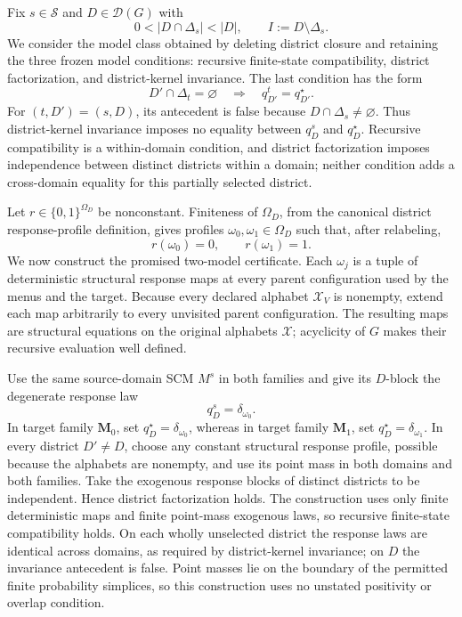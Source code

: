 Fix \(s\in\mathcal S\) and \(D\in\mathcal D(G)\) with
\[
0<\lvert D\cap\Delta_s\rvert<\lvert D\rvert,
\qquad I:=D\setminus\Delta_s.
\]
We consider the model class obtained by deleting district closure and retaining the three frozen model conditions: recursive finite-state compatibility, district factorization, and district-kernel invariance.  The last condition has the form
\[
D'\cap\Delta_t=\varnothing
\quad\Longrightarrow\quad
q_{D'}^t=q_{D'}^\star.
\]
For \((t,D')=(s,D)\), its antecedent is false because \(D\cap\Delta_s\ne\varnothing\).  Thus district-kernel invariance imposes no equality between \(q_D^s\) and \(q_D^\star\).  Recursive compatibility is a within-domain condition, and district factorization imposes independence between distinct districts within a domain; neither condition adds a cross-domain equality for this partially selected district.

Let \(r\in\{0,1\}^{\Omega_D}\) be nonconstant.  Finiteness of \(\Omega_D\), from the canonical district response-profile definition, gives profiles \(\omega_0,\omega_1\in\Omega_D\) such that, after relabeling,
\[
r(\omega_0)=0,
\qquad
r(\omega_1)=1.
\]
We now construct the promised two-model certificate.  Each \(\omega_j\) is a tuple of deterministic structural response maps at every parent configuration used by the menus and the target.  Because every declared alphabet \(\mathcal X_V\) is nonempty, extend each map arbitrarily to every unvisited parent configuration.  The resulting maps are structural equations on the original alphabets \(\mathcal X\); acyclicity of \(G\) makes their recursive evaluation well defined.

Use the same source-domain SCM \(M^s\) in both families and give its \(D\)-block the degenerate response law
\[
q_D^s=\delta_{\omega_0}.
\]
In target family \(\mathbf M_0\), set \(q_D^\star=\delta_{\omega_0}\), whereas in target family \(\mathbf M_1\), set \(q_D^\star=\delta_{\omega_1}\).  In every district \(D'\ne D\), choose any constant structural response profile, possible because the alphabets are nonempty, and use its point mass in both domains and both families.  Take the exogenous response blocks of distinct districts to be independent.  Hence district factorization holds.  The construction uses only finite deterministic maps and finite point-mass exogenous laws, so recursive finite-state compatibility holds.  On each wholly unselected district the response laws are identical across domains, as required by district-kernel invariance; on \(D\) the invariance antecedent is false.  Point masses lie on the boundary of the permitted finite probability simplices, so this construction uses no unstated positivity or overlap condition.

